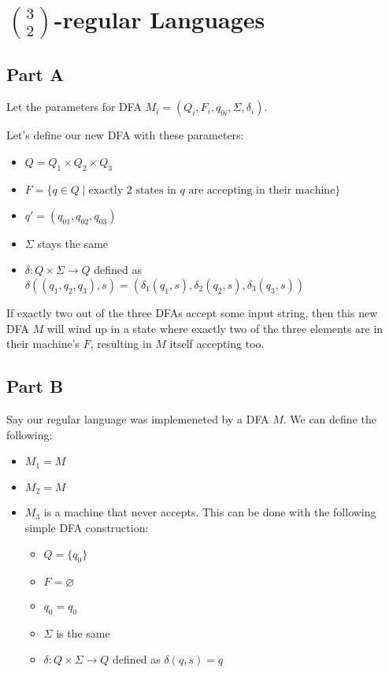 \documentclass[12pt]{article}
\begin{document}
\section{\texorpdfstring{$\binom{3}{2}$}{3C2}-regular Languages}

\subsection*{Part A}

Let the parameters for DFA $M_i=(Q_i, F_i, q_{0i}, \Sigma, \delta_i)$.

Let's define our new DFA with these parameters:
\begin{itemize}[nolistsep]
    \item $Q=Q_1 \times Q_2 \times Q_3$
    \item $F=\{q \in Q \mid \text{exactly 2 states in $q$ are accepting in their machine}\}$
    \item $q'=\left(q_{01}, q_{02}, q_{03}\right)$
    \item $\Sigma$ stays the same
    \item $\delta: Q \times \Sigma \rightarrow Q$ defined as
          $\delta((q_1, q_2, q_3), s)=(\delta_1(q_1, s), \delta_2(q_2, s), \delta_3(q_3, s))$
\end{itemize}

If exactly two out of the three DFAs accept some input string, then this
new DFA $M$ will wind up in a state where exactly two of the three elements
are in their machine's $F$, resulting in $M$ itself accepting too.

\subsection*{Part B}

Say our regular language was implemeneted by a DFA $M$.
We can define the following:
\begin{itemize}[nolistsep]
    \item $M_1=M$
    \item $M_2=M$
    \item $M_3$ is a machine that never accepts.
          This can be done with the following simple DFA construction:
          \begin{itemize}[nolistsep]
              \item $Q=\{q_0\}$
              \item $F=\varnothing$
              \item $q_0=q_0$
              \item $\Sigma$ is the same
              \item $\delta: Q \times \Sigma \rightarrow Q$ defined as $\delta(q, s)=q$
          \end{itemize}
\end{itemize}
\end{document}
